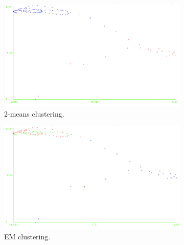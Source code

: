 \documentclass[11pt, letterpaper]{article}            %
\begin{document}
\begin{figure}[htbp]
  \centering
  \begin{subfigure}[b]{0.32\textwidth}
    \includegraphics[width=\textwidth]{./gfx/km12.png}
    \caption{2-means clustering.\label{fig:avgstd:km}}
  \end{subfigure}
  \hfill
  \begin{subfigure}[b]{0.32\textwidth}
    \includegraphics[width=\textwidth]{./gfx/em12.png}
    \caption{EM clustering.\label{fig:avgstd:em}}
  \end{subfigure}
  \hfill
  \begin{subfigure}[b]{0.32\textwidth}

\end{subfigure}
\end{figure}
\end{document}
